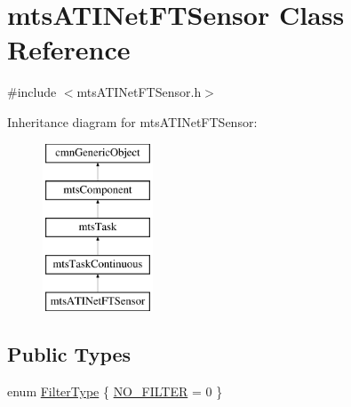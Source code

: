\hypertarget{classmts_a_t_i_net_f_t_sensor}{}\section{mts\+A\+T\+I\+Net\+F\+T\+Sensor Class Reference}
\label{classmts_a_t_i_net_f_t_sensor}


{\ttfamily \#include $<$mts\+A\+T\+I\+Net\+F\+T\+Sensor.\+h$>$}

Inheritance diagram for mts\+A\+T\+I\+Net\+F\+T\+Sensor\+:\begin{figure}[H]
\begin{center}
\leavevmode
\includegraphics[height=5.000000cm]{d3/d28/classmts_a_t_i_net_f_t_sensor}
\end{center}
\end{figure}
\subsection*{Public Types}
\begin{DoxyCompactItemize}
\item 
enum \hyperlink{classmts_a_t_i_net_f_t_sensor_ac0b6761b0eee98b4413c5a153865c2ea}{Filter\+Type} \{ \hyperlink{classmts_a_t_i_net_f_t_sensor_ac0b6761b0eee98b4413c5a153865c2eaab52493358557bae4766830c60064eec9}{N\+O\+\_\+\+F\+I\+L\+T\+E\+R} = 0
 \}
\end{DoxyCompactItemize}
